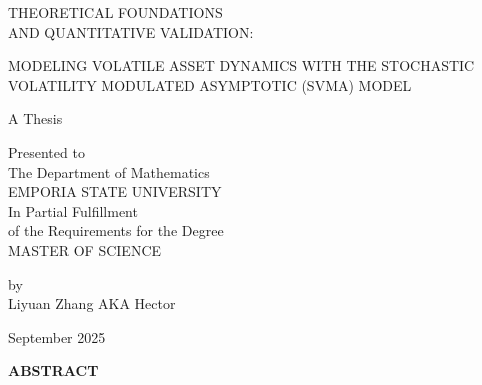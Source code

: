 \documentclass[12pt]{report}
\begin{document}
\begin{titlepage}
\begin{center}
\Large{THEORETICAL FOUNDATIONS \\ AND QUANTITATIVE VALIDATION: \\

\vspace{0.2in}

MODELING VOLATILE ASSET DYNAMICS WITH THE STOCHASTIC VOLATILITY MODULATED ASYMPTOTIC (SVMA) MODEL}

\vspace{1.0in}

\large A Thesis

\vspace{1.0in}

\normalsize Presented to \\
The Department of Mathematics \\
EMPORIA STATE UNIVERSITY \\
In Partial Fulfillment \\
of the Requirements for the Degree \\
MASTER OF SCIENCE

\vspace{1.0in}

\normalsize by \\
Liyuan Zhang AKA Hector

\vspace{0.5in}

\normalsize September 2025
\vfill
\end{center}
\end{titlepage}
\newpage
\thispagestyle{empty}
\begin{center}
    \textbf{ABSTRACT}
\end{center}
\vspace{0.5in}
\normalsize
\end{document}
